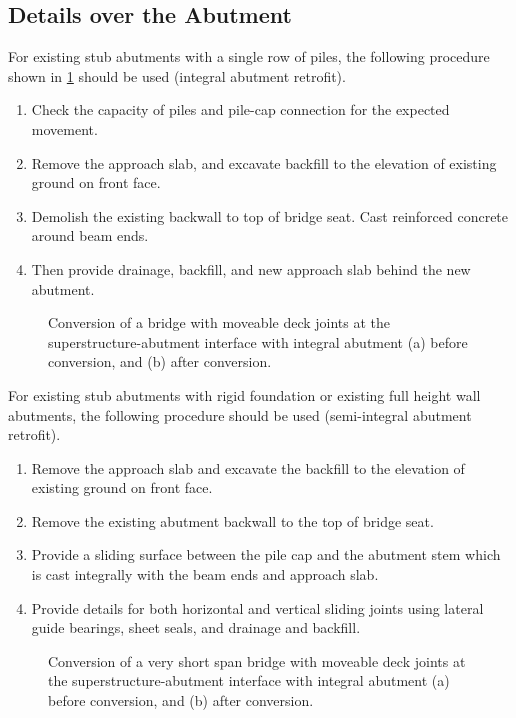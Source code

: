 \subsection{Details over the Abutment}
For existing stub abutments with a single row of piles, the following procedure shown in \cref{fig:conversion-moveable-integral} should be used (integral abutment retrofit).
\begin{enumerate}
  \item Check the capacity of piles and pile-cap connection for the expected movement.
  \item Remove the approach slab, and excavate backfill to the elevation of existing ground on front face.
  \item Demolish the existing backwall to top of bridge seat. Cast reinforced concrete around beam ends.
  \item Then provide drainage, backfill, and new approach slab behind the new abutment.
\end{enumerate}

\begin{figure}
  \caption{Conversion of a bridge with moveable deck joints at the superstructure-abutment interface with integral abutment (a) before conversion, and (b) after conversion.}
  \label{fig:conversion-moveable-integral}
\end{figure}

For existing stub abutments with rigid foundation or existing full height wall abutments, the following procedure should be used (semi-integral abutment retrofit).
\begin{enumerate}
  \item Remove the approach slab and excavate the backfill to the elevation of existing ground on front face.
  \item Remove the existing abutment backwall to the top of bridge seat.
  \item Provide a sliding surface between the pile cap and the abutment stem which is cast integrally with the
  beam ends and approach slab.
  \item Provide details for both horizontal and vertical sliding joints using lateral guide bearings, sheet seals, and
  drainage and backfill.
\end{enumerate}

\begin{figure}
  \caption{Conversion of a very short span bridge with moveable deck joints at the superstructure-abutment
  interface with integral abutment (a) before conversion, and (b) after conversion.}
  \label{fig:conversion-moveable-integral-short-span}
\end{figure}

